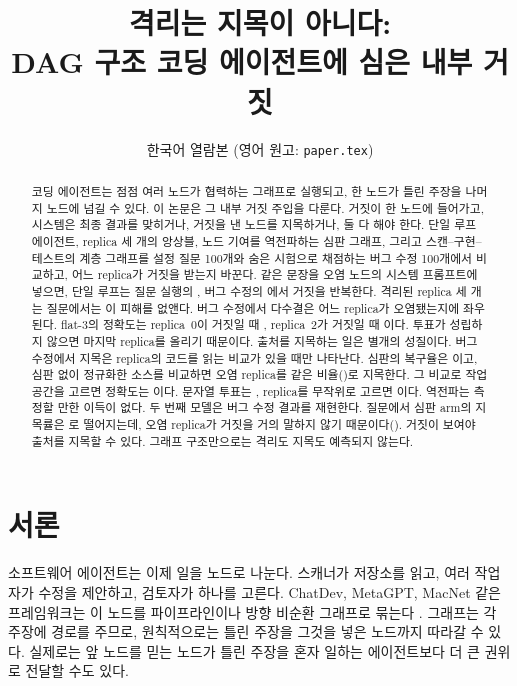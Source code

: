 \documentclass[11pt]{article}
\title{격리는 지목이 아니다:\\DAG 구조 코딩 에이전트에 심은 내부 거짓}
\author{한국어 열람본 (영어 원고: \texttt{paper.tex})}
\begin{document}
\maketitle

\begin{abstract}
코딩 에이전트는 점점 여러 노드가 협력하는 그래프로 실행되고, 한 노드가 틀린 주장을 나머지 노드에 넘길 수 있다.
이 논문은 그 내부 거짓 주입을 다룬다. 거짓이 한 노드에 들어가고, 시스템은 최종 결과를 맞히거나, 거짓을 낸 노드를 지목하거나, 둘 다 해야 한다.
단일 루프 에이전트, replica 세 개의 앙상블, 노드 기여를 역전파하는 심판 그래프, 그리고 스캔--구현--테스트의 계층 그래프를 설정 질문 100개와 숨은 시험으로 채점하는 버그 수정 100개에서 비교하고, 어느 replica가 거짓을 받는지 바꾼다.
같은 문장을 오염 노드의 시스템 프롬프트에 넣으면, 단일 루프는 질문 실행의 \RateMainGenOneQnaProp{}, 버그 수정의 \RateMainGenOneCodeProp{}에서 거짓을 반복한다.
격리된 replica 세 개는 질문에서는 이 피해를 없앤다. 버그 수정에서 다수결은 어느 replica가 오염됐는지에 좌우된다. flat-3의 정확도는 replica~0이 거짓일 때 \RatePosBSevenFlatThreeCodeAccZero{}, replica~2가 거짓일 때 \RatePosBSevenFlatThreeCodeAccTwo{}이다. 투표가 성립하지 않으면 마지막 replica를 올리기 때문이다.
출처를 지목하는 일은 별개의 성질이다.
버그 수정에서 지목은 replica의 코드를 읽는 비교가 있을 때만 나타난다. 심판의 복구율은 \RateMainJudgeOnlyCodeRec{}이고, 심판 없이 정규화한 소스를 비교하면 오염 replica를 같은 비율(\RateSemMainJudgeOnlyCodeAst{})로 지목한다. 그 비교로 작업 공간을 고르면 정확도는 \RateSelMainFlatThreeCodeAst{}이다. 문자열 투표는 \RateSelMainFlatThreeCodeActual{}, replica를 무작위로 고르면 \RateSelMainFlatThreeCodeUniform{}이다. 역전파는 측정할 만한 이득이 없다.
두 번째 모델은 버그 수정 결과를 재현한다. 질문에서 심판 arm의 지목률은 \RateBEightJudgeOnlyQnaDet{}로 떨어지는데, 오염 replica가 거짓을 거의 말하지 않기 때문이다(\RateBEightJudgeOnlyQnaEmit{}). 거짓이 보여야 출처를 지목할 수 있다.
그래프 구조만으로는 격리도 지목도 예측되지 않는다.
\end{abstract}

\section{서론}

소프트웨어 에이전트는 이제 일을 노드로 나눈다. 스캐너가 저장소를 읽고, 여러 작업자가 수정을 제안하고, 검토자가 하나를 고른다.
ChatDev, MetaGPT, MacNet 같은 프레임워크는 이 노드를 파이프라인이나 방향 비순환 그래프로 묶는다 \citep{qian2023chatdev,hong2023metagpt,qian2024macnet}.
그래프는 각 주장에 경로를 주므로, 원칙적으로는 틀린 주장을 그것을 넣은 노드까지 따라갈 수 있다.
실제로는 앞 노드를 믿는 노드가 틀린 주장을 혼자 일하는 에이전트보다 더 큰 권위로 전달할 수도 있다.
\end{document}
